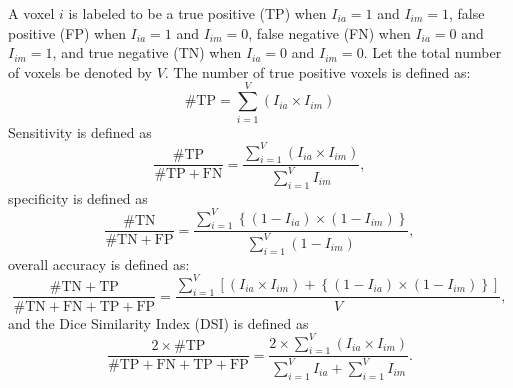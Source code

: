 A voxel $i$ is labeled to be a true positive (TP) when $I_{ia} = 1$ and $I_{im} = 1$, false positive (FP) when $I_{ia} = 1$ and $I_{im} = 0$, false negative (FN) when $I_{ia} = 0$ and $I_{im} = 1$, and true negative (TN) when $I_{ia} = 0$ and $I_{im} = 0$.  Let the total number of voxels be denoted by $V$.  The number of true positive voxels is defined as: 
$$
\# \text{TP} = \sum_{i=1}^{V} \left( I_{ia} \times I_{im}\right)
$$
Sensitivity is defined as
$$
\frac{\# \text{TP} }{\# \text{TP} + \text{FN}} = \frac{ \sum_{i=1}^{V} \left( I_{ia} \times I_{im}\right) }{ \sum_{i=1}^{V} I_{im}},
$$
specificity is defined as
$$
\frac{\# \text{TN} }{\# \text{TN} + \text{FP}} = \frac{ \sum_{i=1}^{V} \left\{ (1-I_{ia}) \times (1- I_{im} ) \right\} }{ \sum_{i=1}^{V} (1 - I_{im} )},
$$
overall accuracy is defined as:
$$
\frac{\# \text{TN} + \text{TP} }{\# \text{TN} + \text{FN} + \text{TP} + \text{FP}} = \frac{ \sum_{i=1}^{V} \left[ (I_{ia} \times I_{im}) + \left\{ (1-I_{ia}) \times (1- I_{im} ) \right\} \right] }{ V },
$$
and the Dice Similarity Index (DSI) is defined as
$$
\frac{2 \times \#\text{TP} }{ \# \text{TP} + \text{FN} + \text{TP} + \text{FP}} = \frac{ 2 \times \sum_{i=1}^{V} \left( I_{ia} \times I_{im}\right) }{\sum_{i=1}^{V} I_{ia}  + \sum_{i=1}^{V} I_{im}}.
$$

